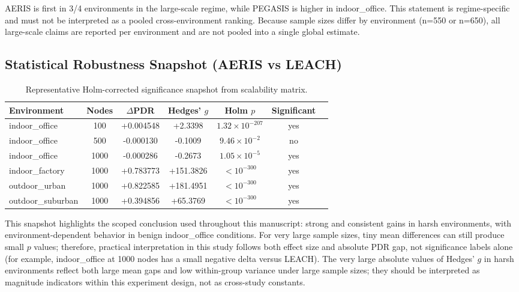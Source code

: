 \documentclass[sensors,article,submit,moreauthors,pdftex]{Definitions/mdpi}
\begin{document}
AERIS is first in 3/4 environments in the large-scale regime, while PEGASIS is higher in indoor\_office. This statement is regime-specific and must not be interpreted as a pooled cross-environment ranking.
Because sample sizes differ by environment (n=550 or n=650), all large-scale claims are reported per environment and are not pooled into a single global estimate.

\subsection{Statistical Robustness Snapshot (AERIS vs LEACH)}
\begin{table}[H]
\caption{Representative Holm-corrected significance snapshot from scalability matrix.}
\label{tab:robust_snapshot}
\centering
\begin{tabular}{lcccccc}
\toprule
Environment & Nodes & $\Delta$PDR & Hedges' $g$ & Holm $p$ & Significant \\
\midrule
indoor\_office    & 100  & +0.004548 & +2.3398 & $1.32\times10^{-207}$ & yes \\
indoor\_office    & 500  & -0.000130 & -0.1009 & $9.46\times10^{-2}$ & no \\
indoor\_office    & 1000 & -0.000286 & -0.2673 & $1.05\times10^{-5}$ & yes \\
indoor\_factory   & 1000 & +0.783773 & +151.3826 & $<10^{-300}$ & yes \\
outdoor\_urban    & 1000 & +0.822585 & +181.4951 & $<10^{-300}$ & yes \\
outdoor\_suburban & 1000 & +0.394856 & +65.3769 & $<10^{-300}$ & yes \\
\bottomrule
\end{tabular}
\end{table}

This snapshot highlights the scoped conclusion used throughout this manuscript: strong and consistent gains in harsh environments, with environment-dependent behavior in benign indoor\_office conditions.
For very large sample sizes, tiny mean differences can still produce small $p$ values; therefore, practical interpretation in this study follows both effect size and absolute PDR gap, not significance labels alone (for example, indoor\_office at 1000 nodes has a small negative delta versus LEACH).
The very large absolute values of Hedges' $g$ in harsh environments reflect both large mean gaps and low within-group variance under large sample sizes; they should be interpreted as magnitude indicators within this experiment design, not as cross-study constants.
\end{document}
